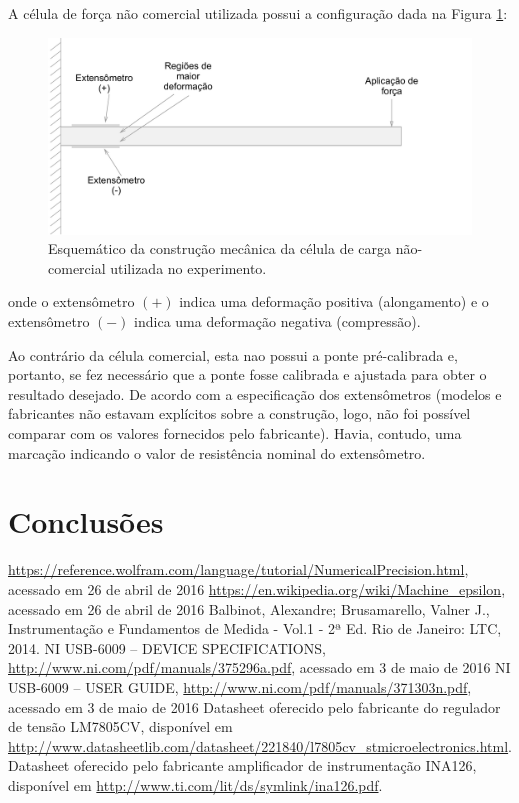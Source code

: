 \documentclass[a4paper]{instrumentacao}
\begin{document}
A célula de força não comercial utilizada possui a configuração dada na Figura \ref{fig:celula-nao-comercial-desenho}:

\begin{figure}[H]
\center
\includegraphics[width=\textwidth]{CelulaNaoComercial.pdf}
\caption{Esquemático da construção mecânica da célula de carga não-comercial utilizada no experimento.}
\label{fig:celula-nao-comercial-desenho}
\end{figure}

\noindent onde o extensômetro $(+)$ indica uma deformação positiva (alongamento) e o extensômetro $(-)$ indica uma deformação negativa (compressão).

Ao contrário da célula comercial, esta nao possui a ponte pré-calibrada e, portanto, se fez necessário que a ponte fosse calibrada e ajustada para obter o resultado desejado. De acordo com a especificação dos extensômetros (modelos e fabricantes não estavam explícitos sobre a construção, logo, não foi possível comparar com os valores fornecidos pelo fabricante). Havia, contudo, uma marcação indicando o valor de resistência nominal do extensômetro.


\chapter{Conclusões}



\newpage
\begin{thebibliography}{9}
 \url{https://reference.wolfram.com/language/tutorial/NumericalPrecision.html}, acessado em 26 de abril de 2016
 \url{https://en.wikipedia.org/wiki/Machine_epsilon}, acessado em 26 de abril de 2016
  Balbinot, Alexandre; Brusamarello, Valner J., Instrumentação e Fundamentos de Medida - Vol.1 - 2ª Ed. Rio de Janeiro: LTC, 2014.
 NI USB-6009 -- DEVICE SPECIFICATIONS, \url{http://www.ni.com/pdf/manuals/375296a.pdf}, acessado em 3 de maio de 2016
 NI USB-6009 -- USER GUIDE, \url{http://www.ni.com/pdf/manuals/371303n.pdf}, acessado em 3 de maio de 2016
 Datasheet oferecido pelo fabricante do regulador de tensão LM7805CV, disponível em \url{http://www.datasheetlib.com/datasheet/221840/l7805cv_stmicroelectronics.html}.
 Datasheet oferecido pelo fabricante amplificador de instrumentação INA126, disponível em \url{http://www.ti.com/lit/ds/symlink/ina126.pdf}.

\end{thebibliography}
\end{document}
